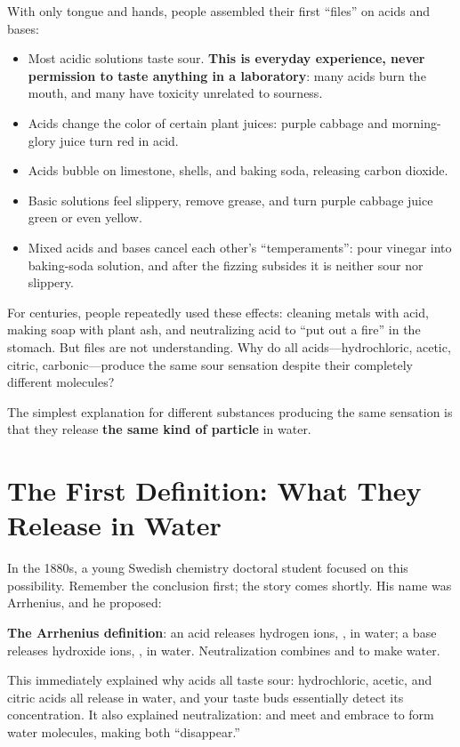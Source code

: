 With only tongue and hands, people assembled their first ``files'' on acids and bases:

\begin{itemize}[itemsep=2pt]
\item Most acidic solutions taste sour. \textbf{This is everyday experience, never permission to taste anything in a laboratory}: many acids burn the mouth, and many have toxicity unrelated to sourness.
\item Acids change the color of certain plant juices: purple cabbage and morning-glory juice turn red in acid.
\item Acids bubble on limestone, shells, and baking soda, releasing carbon dioxide.
\item Basic solutions feel slippery, remove grease, and turn purple cabbage juice green or even yellow.
\item Mixed acids and bases cancel each other's ``temperaments'': pour vinegar into baking-soda solution, and after the fizzing subsides it is neither sour nor slippery.
\end{itemize}

For centuries, people repeatedly used these effects: cleaning metals with acid, making soap with plant ash, and neutralizing acid to ``put out a fire'' in the stomach. But files are not understanding. Why do all acids---hydrochloric, acetic, citric, carbonic---produce the same sour sensation despite their completely different molecules?

The simplest explanation for different substances producing the same sensation is that they release \textbf{the same kind of particle} in water.

\section{The First Definition: What They Release in Water}

In the 1880s, a young Swedish chemistry doctoral student focused on this possibility. Remember the conclusion first; the story comes shortly. His name was Arrhenius, and he proposed:

\begin{qiaoliang}
\textbf{The Arrhenius definition}: an acid releases hydrogen ions, , in water; a base releases hydroxide ions, , in water. Neutralization combines  and  to make water.
\end{qiaoliang}

This immediately explained why acids all taste sour: hydrochloric, acetic, and citric acids all release  in water, and your taste buds essentially detect its concentration. It also explained neutralization:  and  meet and embrace to form water molecules, making both ``disappear.''

